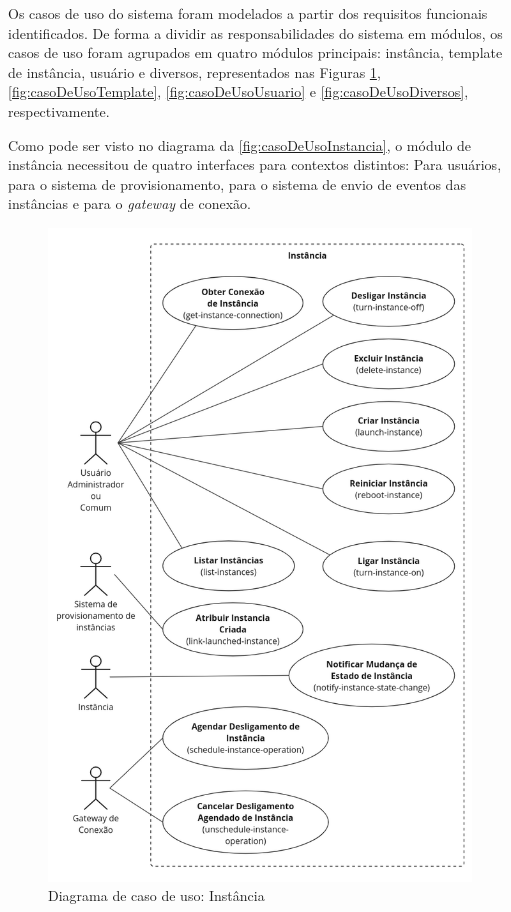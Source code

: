 Os casos de uso do sistema foram modelados a partir dos requisitos funcionais identificados. De forma a dividir as responsabilidades do sistema em módulos, os casos de uso foram agrupados em quatro módulos principais: instância, template de instância, usuário e diversos, representados nas Figuras \ref{fig:casoDeUsoInstancia}, \ref{fig:casoDeUsoTemplate}, \ref{fig:casoDeUsoUsuario} e \ref{fig:casoDeUsoDiversos}, respectivamente.

Como pode ser visto no diagrama da \autoref{fig:casoDeUsoInstancia}, o módulo de instância necessitou de quatro interfaces para contextos distintos: Para usuários, para o sistema de provisionamento, para o sistema de envio de eventos das instâncias e para o \textit{gateway} de conexão.

\begin{figure}[H] %
\caption{Diagrama de caso de uso: Instância}
\label{fig:casoDeUsoInstancia}
\includegraphics[width=\textwidth]{capitulos/2-metodologia/files/use-case-instance.png}
\end{figure}

